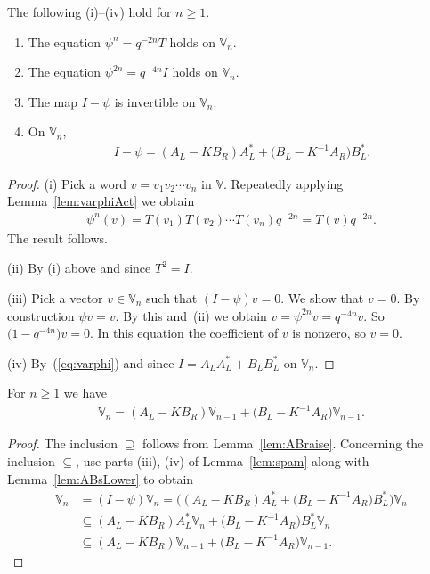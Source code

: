 \begin{Lemma}\label{lem:spam} The following {\rm (i)--(iv)} hold for $n\geq 1$.
\begin{enumerate}\itemsep=0pt
\item[\rm (i)]
The equation
$\psi^n = q^{-2n} T$ holds
on $\mathbb V_n$.
\item[\rm (ii)] The equation
$\psi^{2n} = q^{-4n} I$ holds
on $\mathbb V_n$.
\item[\rm (iii)]
The map $I-\psi$ is invertible on $\mathbb V_n$.
\item[\rm (iv)] On $\mathbb V_n$,
\begin{gather*}
I-\psi= (A_L-K B_R)A^*_L +\big(B_L-K^{-1} A_R\big)B^*_L.
\end{gather*}
\end{enumerate}
\end{Lemma}
\begin{proof} (i) Pick a word $v=v_1v_2 \cdots v_n$ in $\mathbb V$. Repeatedly applying Lemma~\ref{lem:varphiAct} we obtain
\begin{gather*}
\psi^n(v) = T(v_1) T(v_2) \cdots T(v_n) q^{-2n} = T(v) q^{-2n}.
\end{gather*}
The result follows.

(ii) By (i) above and since $T^2=I$.

(iii) Pick a vector $v\in \mathbb V_n$ such that $(I-\psi)v=0$. We show that $v=0$. By construction $\psi v = v$. By this and~(ii) we obtain $v=\psi^{2n}v = q^{-4n} v$. So $\big(1-q^{-4n}\big)v=0$. In this equation the coefficient of $v$ is nonzero, so $v=0$.

(iv) By~(\ref{eq:varphi}) and since $I = A_L A^*_L + B_L B^*_L$ on $\mathbb V_n$.
\end{proof}

\begin{Lemma}\label{lem:span} For $n\geq 1$ we have
\begin{gather*}
\mathbb V_n = (A_L - K B_R)\mathbb V_{n-1} + \big(B_L-K^{-1} A_R\big)\mathbb V_{n-1}.%
\end{gather*}
\end{Lemma}
\begin{proof}The inclusion $\supseteq $ follows from Lemma~\ref{lem:ABraise}. Concerning the inclusion $\subseteq$, use parts (iii), (iv) of Lemma~\ref{lem:spam} along with Lemma~\ref{lem:ABsLower} to obtain
\begin{align*}
\mathbb V_n &= (I-\psi)\mathbb V_n =\bigl((A_L-K B_R)A^*_L+ \big(B_L-K^{-1} A_R\big)B^*_L\bigr) \mathbb V_n\\
&\subseteq(A_L-K B_R)A^*_L \mathbb V_n + \big(B_L-K^{-1} A_R\big)B^*_L\mathbb V_n\\
&\subseteq (A_L-K B_R) \mathbb V_{n-1}+ \big(B_L-K^{-1} A_R\big) \mathbb V_{n-1}.\tag*{\qed}
\end{align*}\renewcommand{\qed}{}
\end{proof}

